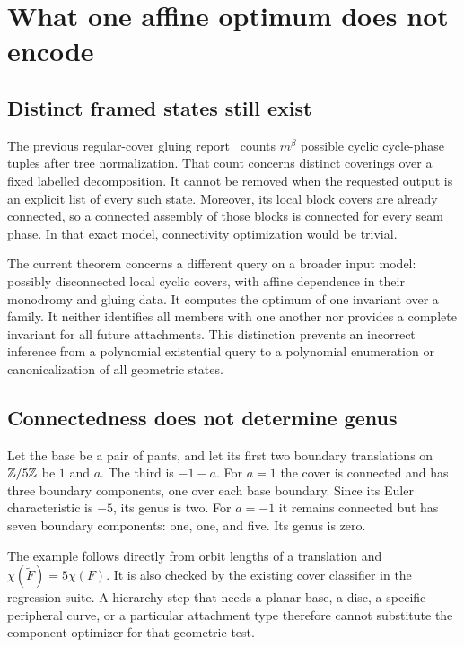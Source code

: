 \section{What one affine optimum does not encode}
\label{sec:boundaries}

\subsection{Distinct framed states still exist}

The previous regular-cover gluing report~\cite{certificates} counts
$m^\beta$ possible cyclic cycle-phase tuples after tree normalization.
That count concerns distinct coverings over a fixed labelled
decomposition. It cannot be removed when the requested output is an
explicit list of every such state. Moreover, its local block covers are
already connected, so a connected assembly of those blocks is connected
for every seam phase. In that exact model, connectivity optimization
would be trivial.

The current theorem concerns a different query on a broader input model:
possibly disconnected local cyclic covers, with affine dependence in
their monodromy and gluing data. It computes the optimum of one invariant
over a family. It neither identifies all members with one another nor
provides a complete invariant for all future attachments. This distinction
prevents an incorrect inference from a polynomial existential query to
a polynomial enumeration or canonicalization of all geometric states.

\subsection{Connectedness does not determine genus}

\begin{example}
\label{ex:genus}
Let the base be a pair of pants, and let its first two boundary
translations on $\mathbb Z/5\mathbb Z$ be $1$ and $a$. The third is $-1-a$.
For $a=1$ the cover is connected and has three boundary components,
one over each base boundary. Since its Euler characteristic is $-5$,
its genus is two. For $a=-1$ it remains connected but has seven boundary
components: one, one, and five. Its genus is zero.
\end{example}

The example follows directly from orbit lengths of a translation and
$\chi(\widetilde F)=5\chi(F)$. It is also checked by the existing cover
classifier in the regression suite. A hierarchy step that needs a planar
base, a disc, a specific peripheral curve, or a particular attachment
type therefore cannot substitute the component optimizer for that
geometric test.

